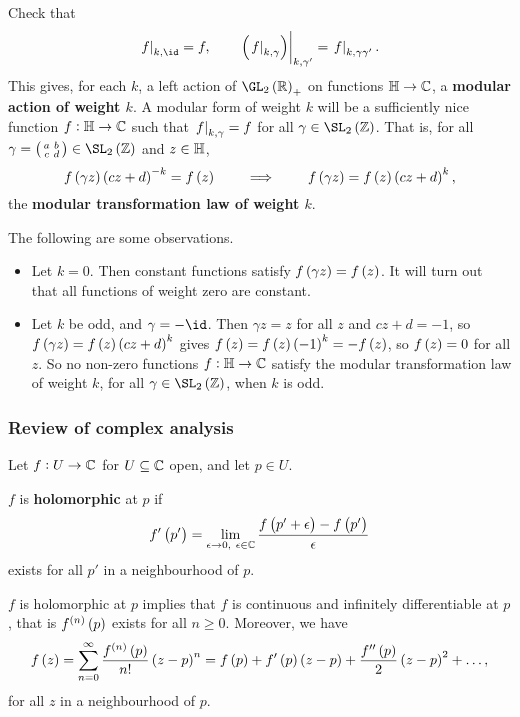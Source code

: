 Check that
$$ \eval{f}_{k, \id} = f, \qquad \eval{\br{\eval{f}_{k, \gamma}}}_{k, \gamma'} = \eval{f}_{k, \gamma\gamma'}. $$
This gives, for each $ k $, a left action of $ \GL_2\br{\RR}_+ $ on functions $ \mathbb{H} \to \mathbb{C} $, a \textbf{modular action of weight $ k $}. A modular form of weight $ k $ will be a sufficiently nice function $ f : \mathbb{H} \to \mathbb{C} $ such that $ \left. f \right|_{k, \gamma} = f $ for all $ \gamma \in \SL_2\br{\ZZ} $. That is, for all $ \gamma = \twobytwosmall{a}{b}{c}{d} \in \SL_2\br{\ZZ} $ and $ z \in \mathbb{H} $,
$$ f\br{\gamma z}\br{cz + d}^{-k} = f\br{z} \qquad \implies \qquad f\br{\gamma z} = f\br{z}\br{cz + d}^k, $$
the \textbf{modular transformation law of weight $ k $}.

\pagebreak

The following are some observations.
\begin{itemize}
\item Let $ k = 0 $. Then constant functions satisfy $ f\br{\gamma z} = f\br{z} $. It will turn out that all functions of weight zero are constant.
\item Let $ k $ be odd, and $ \gamma = -\id $. Then $ \gamma z = z $ for all $ z $ and $ cz + d = -1 $, so $ f\br{\gamma z} = f\br{z}\br{cz + d}^k $ gives $ f\br{z} = f\br{z}\br{-1}^k = -f\br{z} $, so $ f\br{z} = 0 $ for all $ z $. So no non-zero functions $ f : \mathbb{H} \to \mathbb{C} $ satisfy the modular transformation law of weight $ k $, for all $ \gamma \in \SL_2\br{\ZZ} $, when $ k $ is odd.
\end{itemize}

\subsubsection{Review of complex analysis}

Let $ f : U \to \mathbb{C} $ for $ U \subseteq \mathbb{C} $ open, and let $ p \in U $.

\begin{definition}
$ f $ is \textbf{holomorphic} at $ p $ if
$$ f'\br{p'} = \lim_{\epsilon \to 0, \ \epsilon \in \CC} \dfrac{f\br{p' + \epsilon} - f\br{p'}}{\epsilon} $$
exists for all $ p' $ in a neighbourhood of $ p $.
\end{definition}

\begin{proposition}
$ f $ is holomorphic at $ p $ implies that $ f $ is continuous and infinitely differentiable at $ p $, that is $ f^{\br{n}}\br{p} $ exists for all $ n \ge 0 $. Moreover, we have
$$ f\br{z} = \sum_{n = 0}^\infty \dfrac{f^{\br{n}}\br{p}}{n!}\br{z - p}^n = f\br{p} + f'\br{p}\br{z - p} + \dfrac{f''\br{p}}{2}\br{z - p}^2 + \dots, $$
for all $ z $ in a neighbourhood of $ p $.
\end{proposition}

